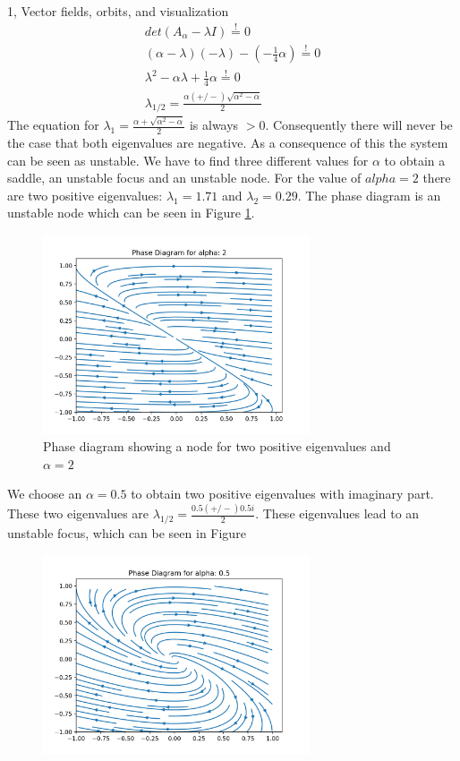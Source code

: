\documentclass[10pt,a4paper]{article}
\begin{document}
\begin{task}{1, Vector fields, orbits, and visualization}
\begin{align*}
    det(A_\alpha - \lambda I) \overset{!}{=} 0 \\
    (\alpha -\lambda)(-\lambda) - (-\frac{1}{4}\alpha) \overset{!}{=}0\\
    \lambda^2-\alpha \lambda + \frac{1}{4}\alpha \overset{!}{=}0\\
    \lambda_{1/2} = \frac{\alpha (+/-) \sqrt{\alpha^2-\alpha}}{2}
\end{align*}
The equation for $\lambda_1 =  \frac{\alpha + \sqrt{\alpha^2-\alpha}}{2}$ is always $> 0$. Consequently there will never be the case that both eigenvalues are negative. As a consequence of this the system can be seen as unstable. We have to find three different values for $\alpha$ to obtain a saddle, an unstable focus and an unstable node. For the value of $alpha = 2$ there are two positive eigenvalues: $\lambda_1 = 1.71$ and $\lambda_2 = 0.29$. The phase diagram is an unstable node which can be seen in Figure \ref{fig:task1_node}.
\begin{figure}[H]
    \centering
    \includegraphics[width=0.7\textwidth]{../plots/node.png}
    \caption{Phase diagram showing a node for two positive eigenvalues and $\alpha = 2$}
    \label{fig:task1_node}
\end{figure}
We choose an $\alpha = 0.5$ to obtain two positive eigenvalues with imaginary part. These two eigenvalues are $\lambda_{1/2} = \frac{0.5 (+/-) 0.5i}{2}$. These eigenvalues lead to an unstable focus, which can be seen in Figure
\begin{figure}[H]
    \centering
    \includegraphics[width=0.7\textwidth]{../plots/focus.png}

\end{figure}
\end{task}
\end{document}
